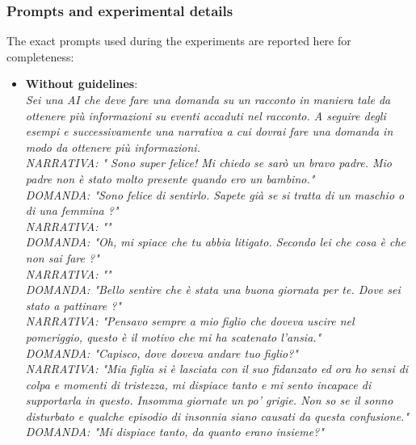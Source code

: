 \subsubsection{Prompts and experimental details}
% 
The exact prompts used during the experiments are reported here for completeness:
\begin{itemize}
    \item \textbf{Without guidelines}: \\ \emph{Sei una AI che deve fare una domanda su un racconto in maniera tale da ottenere più informazioni su eventi accaduti nel racconto. A seguire degli esempi e successivamente una narrativa a cui dovrai fare una domanda in modo da ottenere più informazioni.\\
       NARRATIVA: "  Sono super felice! Mi chiedo se sarò un bravo padre. \highLight[highlightred]Mio padre non è stato molto presente quando ero un bambino."\\
       DOMANDA: "Sono felice di sentirlo. Sapete già se si tratta di un maschio o di una femmina ?"\\
       NARRATIVA: ""\\
       DOMANDA: "Oh, mi spiace che tu abbia litigato. Secondo lei che cosa è che non sai fare ?"\\
       NARRATIVA: ""\\
       DOMANDA: "Bello sentire che è stata una buona giornata per te. Dove sei stato a pattinare ?"\\
       NARRATIVA: "Pensavo sempre a mio figlio che doveva uscire nel pomeriggio, questo è il motivo che mi ha scatenato l’ansia."\\
       DOMANDA: "Capisco, dove doveva andare tuo figlio?"\\
       NARRATIVA: "Mia figlia si è lasciata con il suo fidanzato ed ora ho sensi di colpa e momenti di tristezza, mi dispiace tanto e mi sento incapace di supportarla in questo. Insomma giornate un po’ grigie. Non so se il sonno disturbato e qualche episodio di insonnia siano causati da questa confusione."\\
       DOMANDA: "Mi dispiace tanto, da quanto erano insieme?"\\
}
\end{itemize}
